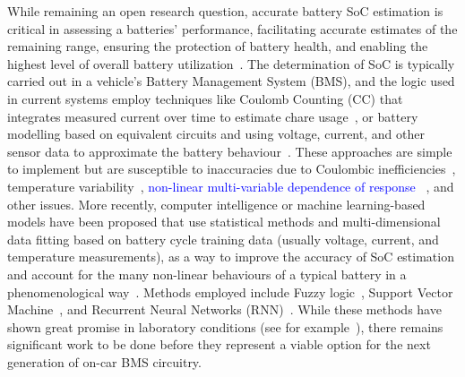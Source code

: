 %
%
While remaining an open research question, accurate battery SoC estimation is critical in assessing a batteries' performance, facilitating accurate estimates of the remaining range, ensuring the protection of battery health, and enabling the highest level of overall battery utilization~\cite{yamin_embedded_2014}.
The determination of SoC is typically carried out in a vehicle's Battery Management System (BMS), and the logic used in current systems employ techniques like Coulomb Counting (CC) that integrates measured current over time to estimate chare usage~\cite{robust_SoC}, or battery modelling based on equivalent circuits and using voltage, current, and other sensor data to approximate the battery behaviour~\cite{6953745}.%
These approaches are simple to implement but are susceptible to inaccuracies due to Coulombic inefficiencies~\cite{Smith_2010}, temperature variability~\cite{xing_state_2014}, \textcolor{blue}{non-linear multi-variable dependence of response ~\cite{hansen_support_2005,anton_battery_2013,he_state_2014}}, and other issues.
More recently, computer intelligence or machine learning-based models have been proposed that use statistical methods and multi-dimensional data fitting based on battery cycle training data (usually voltage, current, and temperature measurements), as a way to improve the accuracy of SoC estimation and account for the many non-linear behaviours of a typical battery in a phenomenological way~\cite{hansen_support_2005,anton_battery_2013,he_state_2014}.
Methods employed include Fuzzy logic~\cite{malkhandi_fuzzy_2006}, Support Vector Machine~\cite{hansen_support_2005, anton_battery_2013}, and Recurrent Neural Networks (RNN)~\cite{song_lithium-ion_2018,Chemali2017,mamo_long_2020,jiao_gru-rnn_2020,xiao_accurate_2019,javid_adaptive_2020,zhang_deep_2020}.
While these methods have shown great promise in laboratory conditions (see for example~\cite{jiao_gru-rnn_2020}), there remains significant work to be done before they represent a viable option for the next generation of on-car BMS circuitry.

